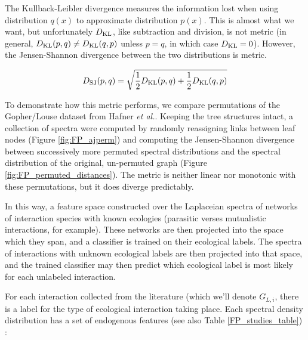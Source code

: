 \noindent The Kullback-Leibler divergence measures the information lost when using distribution $q(x)$ to approximate distribution $p(x)$. This is almost what we want, but unfortunately $D_{\rm KL}$, like subtraction and division, is not metric (in general, $D_{\rm KL}(p,q) \neq D_{\rm KL}(q,p)$ unless $p=q$, in which case $D_{\rm KL}=0$). However, the Jensen-Shannon divergence between the two distributions is metric.

\begin{equation}
    D_{\rm SJ}( p, q ) = \sqrt{ \frac{1}{2} D_{\rm KL}( p, q ) + \frac{1}{2} D_{\rm KL}( q, p ) }
\end{equation}

\noindent To demonstrate how this metric performs, we compare permutations of the Gopher/Louse dataset from Hafner {\em et al.}. Keeping the tree structures intact, a collection of spectra were computed by randomly reassigning links between leaf nodes (Figure \ref{fig:FP_ajperm}) and computing the Jensen-Shannon divergence between successively more permuted spectral distributions and the spectral distribution of the original, un-permuted graph (Figure \ref{fig:FP_permuted_distances}). The metric is neither linear nor monotonic with these permutations, but it does diverge predictably. 







In this way, a feature space constructed over the Laplaceian spectra of networks of interaction species with known ecologies (parasitic verses mutualistic interactions, for example). These networks are then projected into the space which they span, and a classifier is trained on their ecological labels. The spectra of interactions with unknown ecological labels are then projected into that space, and the trained classifier may then predict which ecological label is most likely for each unlabeled interaction.

For each interaction collected from the literature (which we'll denote $G_{L,i}$, there is a label for the type of ecological interaction taking place. Each spectral density distribution has a set of endogenous features (see also Table \ref{FP_studies_table}) :

